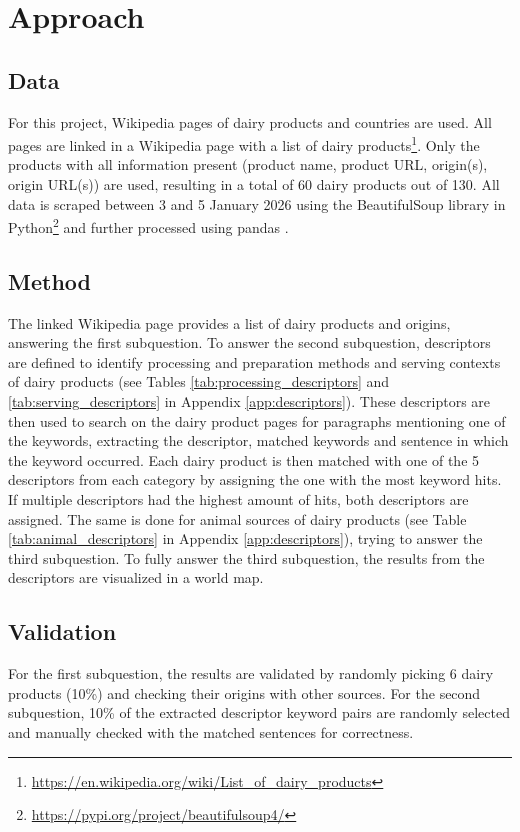 \documentclass[sigconf]{acmart-txmm}
\begin{document}
\section{Approach}
\label{sec:approach}

\subsection{Data}
For this project, Wikipedia pages of dairy products and countries are used. 
All pages are linked in a Wikipedia page with a list of dairy products\footnote{\url{https://en.wikipedia.org/wiki/List_of_dairy_products}}.
Only the products with all information present (product name, product URL, origin(s), origin URL(s)) are used, resulting in a total of 60 dairy products out of 130.
All data is scraped between 3 and 5 January 2026 using the BeautifulSoup library in Python\footnote{\url{https://pypi.org/project/beautifulsoup4/}} and further processed using pandas \cite{the_pandas_development_team_2025_17229934}.

\subsection{Method}
The linked Wikipedia page provides a list of dairy products and origins, answering the first subquestion. 
To answer the second subquestion, descriptors are defined to identify processing and preparation methods and serving contexts of dairy products (see Tables \ref{tab:processing_descriptors} and \ref{tab:serving_descriptors} in Appendix \ref{app:descriptors}).
These descriptors are then used to search on the dairy product pages for paragraphs mentioning one of the keywords, extracting the descriptor, matched keywords and sentence in which the keyword occurred. 
Each dairy product is then matched with one of the 5 descriptors from each category by assigning the one with the most keyword hits.
If multiple descriptors had the highest amount of hits, both descriptors are assigned.
The same is done for animal sources of dairy products (see Table \ref{tab:animal_descriptors} in Appendix \ref{app:descriptors}), trying to answer the third subquestion.
To fully answer the third subquestion, the results from the descriptors are visualized in a world map. 

\subsection{Validation}
For the first subquestion, the results are validated by randomly picking 6 dairy products (10\%) and checking their origins with other sources.
For the second subquestion, 10\% of the extracted descriptor keyword pairs are randomly selected and manually checked with the matched sentences for correctness.
\end{document}
